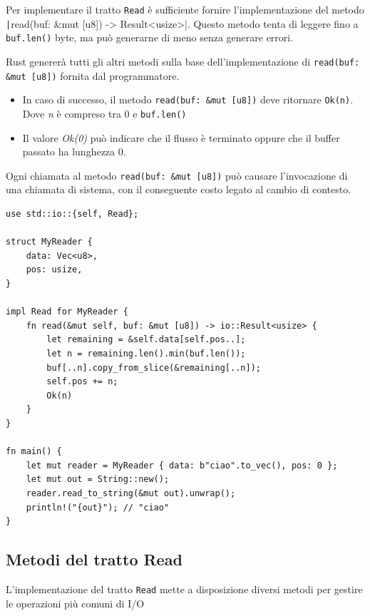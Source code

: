 Per implementare il tratto \verb|Read| è sufficiente fornire l'implementazione
del metodo \\ \texttt|read(buf: &mut [u8]) -> Result<usize>|.
Questo metodo tenta di leggere fino a \texttt{buf.len()} byte, ma può generarne di meno
senza generare errori.

Rust genererà tutti gli altri metodi sulla base dell'implementazione di \texttt{read(buf: \&mut [u8])}
fornita dal programmatore.


\begin{itemize}
  \item In caso di successo, il metodo \texttt{read(buf: \&mut [u8])} deve ritornare \texttt{Ok(n)}.
        Dove \textit{n} è compreso tra 0 e \texttt{buf.len()}
  \item Il valore \textit{Ok(0)} può indicare che il flusso è terminato oppure
        che il buffer passato ha lunghezza 0.
\end{itemize}

Ogni chiamata al metodo \texttt{read(buf: \&mut [u8])}  può causare l'invocazione
di una chiamata di sistema, con il conseguente costo legato al cambio di contesto.

\begin{verbatim}
use std::io::{self, Read};

struct MyReader {
    data: Vec<u8>,
    pos: usize,
}

impl Read for MyReader {
    fn read(&mut self, buf: &mut [u8]) -> io::Result<usize> {
        let remaining = &self.data[self.pos..];
        let n = remaining.len().min(buf.len());
        buf[..n].copy_from_slice(&remaining[..n]);
        self.pos += n;
        Ok(n)
    }
}

fn main() {
    let mut reader = MyReader { data: b"ciao".to_vec(), pos: 0 };
    let mut out = String::new();
    reader.read_to_string(&mut out).unwrap();
    println!("{out}"); // "ciao"
}
\end{verbatim}


\subsection{Metodi del tratto Read}
L'implementazione del tratto \verb|Read| mette a disposizione diversi metodi per gestire
le operazioni più comuni di I/O

